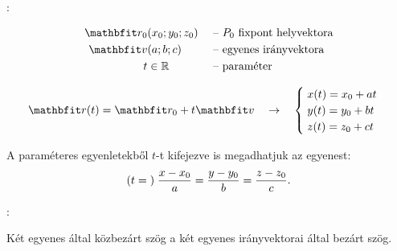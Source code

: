 \documentclass[a4paper, 12pt]{scrartcl}
\begin{document}
\begin{blueBox}
  :

  \begin{minipage}{.45\textwidth}
    \begin{alignat*}{9}
      \rvec r_0 & (x_0; y_0; z_0) &  & \text{ -- $P_0$ fixpont helyvektora} \\
      \rvec v   & (a; b; c)       &  & \text{ -- egyenes irányvektora}      \\
      t         & \in \Reals      &  & \text{ -- paraméter}
    \end{alignat*}
  \end{minipage}\begin{minipage}{.55\textwidth}
    \[
      \rvec r(t) = \rvec r_0 + t \rvec v
      \quad\rightarrow\quad
      \begin{cases}
        \;x(t) = x_0 + a t \\
        \;y(t) = y_0 + b t \\
        \;z(t) = z_0 + c t
      \end{cases}
    \]
  \end{minipage}

  A paraméteres egyenletekből $t$-t kifejezve is megadhatjuk az egyenest:
  \[
    (t = \; ) \;
    \frac{x - x_0}{a} = \frac{y - y_0}{b} = \frac{z - z_0}{c}
    \text.
  \]
\end{blueBox}

\begin{blueBox}
  :

  Két egyenes által közbezárt szög a két egyenes irányvektorai által bezárt
  szög.
\end{blueBox}
\end{document}

